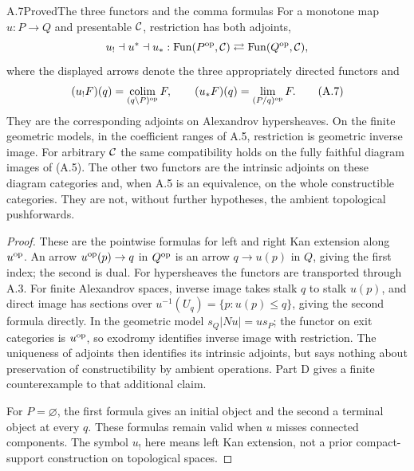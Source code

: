 \begin{statement}{A.7}{Proved}{The three functors and the comma formulas}
For a monotone map $u:P\to Q$ and presentable $\mathcal C$, restriction has both
adjoints,
\[
 u_!\dashv u^*\dashv u_*:
 \operatorname{Fun}(P^{\mathrm{op}},\mathcal C)\rightleftarrows\operatorname{Fun}(Q^{\mathrm{op}},\mathcal C),
\]
where the displayed arrows denote the three appropriately directed
functors and
\[
 (u_!F)(q)=\operatorname*{colim}_{(q\backslash P)^{\mathrm{op}}}F,
 \qquad
 (u_*F)(q)=\operatorname*{lim}_{(P/q)^{\mathrm{op}}}F.
\tag{A.7}
\]
They are the corresponding adjoints on Alexandrov hypersheaves. On the
finite geometric models, in the coefficient ranges of A.5, restriction
is geometric inverse image. For arbitrary $\mathcal C$ the same compatibility
holds on the fully faithful diagram images of (A.5). The other two
functors are the intrinsic adjoints on these diagram categories and,
when A.5 is an equivalence, on the whole constructible categories.
They are not, without further hypotheses, the ambient topological
pushforwards.
\end{statement}
\begin{proof}
These are the pointwise formulas for left and right Kan extension along
$u^{\mathrm{op}}$. An arrow $u^{\mathrm{op}}(p)\to q$ in $Q^{\mathrm{op}}$ is an arrow
$q\to u(p)$ in $Q$, giving the first index; the second is dual. For
hypersheaves the functors are transported through A.3. For finite
Alexandrov spaces, inverse image takes stalk $q$ to stalk $u(p)$, and
direct image has sections over $u^{-1}(U_q)=\{p:u(p)\leq q\}$, giving
the second formula directly. In the geometric model
$s_Q|Nu|=u s_P$; the functor on exit categories is $u^{\mathrm{op}}$, so exodromy
identifies inverse image with restriction. The uniqueness of adjoints
then identifies its intrinsic adjoints, but says nothing about preservation
of constructibility by ambient operations. Part D gives a finite
counterexample to that additional claim.

For $P=\varnothing$, the first formula gives an initial object and the
second a terminal object at every $q$. These formulas remain valid when
$u$ misses connected components. The symbol $u_!$ here means left Kan
extension, not a prior compact-support construction on topological spaces.
\end{proof}

